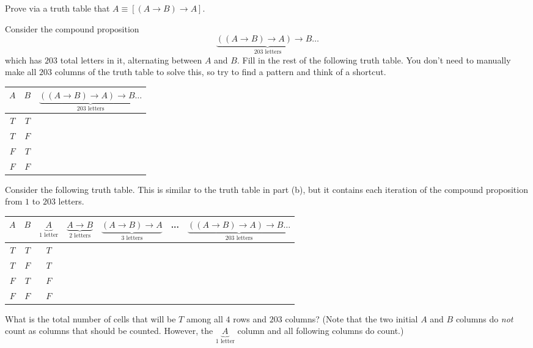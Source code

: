 \documentclass[12pt]{exam}
\begin{document}
\begin{qparts}
    \item Prove via a truth table that $A \equiv \left[ (A \to B) \to A  \right]$.
    \item Consider the compound proposition $$\underbrace{((A\to B) \to A) \to B \dots}_{203 \text{ letters}}$$ which has $203$ total letters in it, alternating between $A$ and $B$. Fill in the rest of the following truth table. You don't need to manually make all $203$ columns of the truth table to solve this, so try to find a pattern and think of a shortcut.
    \begin{center}
            \begin{tabular}{c c | c}
            $A$ & $B$ & $\underbrace{((A\to B) \to A) \to B \dots}_{203 \text{ letters}}$ \\
            \hline
            $T$ & $T$ & \\
            $T$ & $F$ & \\
            $F$ & $T$ & \\
            $F$ & $F$ & \\
            \end{tabular}
    \end{center}
    \item Consider the following truth table. This is similar to the truth table in part (b), but it contains each iteration of the compound proposition from $1$ to $203$ letters.
    \begin{center}
            \begin{tabular}{c c | c | c | c | c | c}
            $A$ & $B$ & $\underbrace{A}_{1 \text{ letter}}$ & $\underbrace{A\to B}_{2 \text{ letters}}$ & $\underbrace{(A\to B) \to A}_{3 \text{ letters}}$ & ... & $\underbrace{((A\to B) \to A) \to B \dots}_{203 \text{ letters}}$ \\
            \hline
            $T$ & $T$ & $T$ & & & \\
            $T$ & $F$ & $T$ & & & \\
            $F$ & $T$ & $F$ & & & \\
            $F$ & $F$ & $F$ & & & \\
            \end{tabular}
    \end{center}
    What is the total number of cells that will be $T$ among all $4$ rows and $203$ columns? (Note that the two initial $A$ and $B$ columns do \emph{not} count as columns that should be counted. However, the $\underbrace{A}_{1 \text{ letter}}$ column and all following columns do count.)
\end{qparts}
\end{document}
